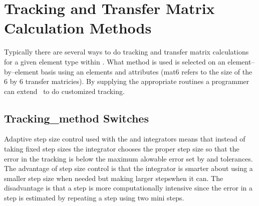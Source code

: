 \chapter{Tracking and Transfer Matrix Calculation Methods}

Typically there are several ways to do tracking and transfer matrix
calculations for a given element type within \bmad. What method is used
is selected on an element--by--element basis using
an elements  and  attributes 
(mat6 refers to the size of the 6 by 6 transfer matricies). By supplying
the appropriate routines a programmer can extend \bmad\ to do customized 
tracking.

\section{Tracking\_method Switches}
\label{s:tkm}

Adaptive step size control used with the  and
 integrators means that instead of taking fixed step sizes
the integrator chooses the proper step size so that the error in the
tracking is below the maximum alowable error set by  and
 tolerances. The advantage of step size control is that
the integrator is smarter about using a smaller step size when needed
but making larger stepswhen it can. The disadvantage is that a step is
more computationally intensive since the error in a step is estimated by
repeating a step using two mini steps.

